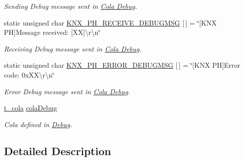 \begin{DoxyCompactItemize}
\begin{DoxyCompactList}\small\item\em Sending Debug message sent in \hyperlink{group___cola___debug}{Cola Debug}. \end{DoxyCompactList}\item 
static unsigned char \hyperlink{group___k_n_x___p_h___sup___private___variables_ga29eb5f6a2e306cf5545c5a6af4623e35}{K\+N\+X\+\_\+\+P\+H\+\_\+\+R\+E\+C\+E\+I\+V\+E\+\_\+\+D\+E\+B\+U\+G\+M\+SG} \mbox{[}$\,$\mbox{]} = \char`\"{}\mbox{[}K\+NX PH\mbox{]}Message received\+: \mbox{[}XX\mbox{]}\textbackslash{}r\textbackslash{}n\char`\"{}\hypertarget{group___k_n_x___p_h___sup___private___variables_ga29eb5f6a2e306cf5545c5a6af4623e35}{}\label{group___k_n_x___p_h___sup___private___variables_ga29eb5f6a2e306cf5545c5a6af4623e35}

\begin{DoxyCompactList}\small\item\em Receiving Debug message sent in \hyperlink{group___cola___debug}{Cola Debug}. \end{DoxyCompactList}\item 
static unsigned char \hyperlink{group___k_n_x___p_h___sup___private___variables_ga598da98824813e3e2781a39bb3f90bfd}{K\+N\+X\+\_\+\+P\+H\+\_\+\+E\+R\+R\+O\+R\+\_\+\+D\+E\+B\+U\+G\+M\+SG} \mbox{[}$\,$\mbox{]} = \char`\"{}\mbox{[}K\+NX PH\mbox{]}Error code\+: 0x\+X\+X\textbackslash{}r\textbackslash{}n\char`\"{}\hypertarget{group___k_n_x___p_h___sup___private___variables_ga598da98824813e3e2781a39bb3f90bfd}{}\label{group___k_n_x___p_h___sup___private___variables_ga598da98824813e3e2781a39bb3f90bfd}

\begin{DoxyCompactList}\small\item\em Error Debug message sent in \hyperlink{group___cola___debug}{Cola Debug}. \end{DoxyCompactList}\item 
\hyperlink{structt__cola}{t\+\_\+cola} \hyperlink{group___k_n_x___p_h___sup___private___variables_ga314fd637d927bd6a2551e119de623aa5}{cola\+Debug}\hypertarget{group___k_n_x___p_h___sup___private___variables_ga314fd637d927bd6a2551e119de623aa5}{}\label{group___k_n_x___p_h___sup___private___variables_ga314fd637d927bd6a2551e119de623aa5}

\begin{DoxyCompactList}\small\item\em Cola defined in \hyperlink{group___debug}{Debug}. \end{DoxyCompactList}\end{DoxyCompactItemize}


\subsection{Detailed Description}
